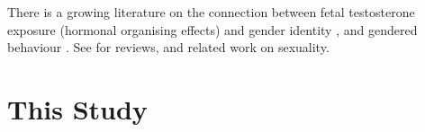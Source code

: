 \documentclass[a0,portrait]{a0poster}
\begin{document}
\begin{multicols}{2}
There is a growing literature on the connection between fetal testosterone exposure (hormonal organising effects) and gender identity \citep{hinesetal2004, berenbaumbailey2003}, and gendered behaviour \citep{hinesetal2002, auyeungetal2009}. See \citet{hines2006, balthazart2011} for reviews, and related work on sexuality.


%
%




\section*{This Study}


\end{multicols}
\end{document}
